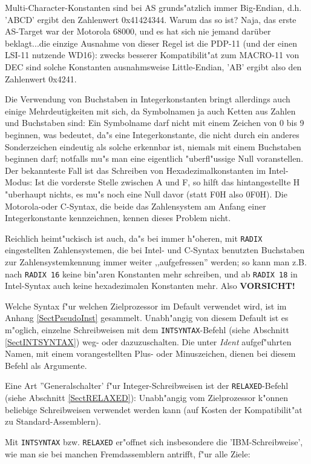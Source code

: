 \documentclass[12pt,a4paper,twoside]{report}
\newcommand{\ii}[1]{{\it #1}}
\newcommand{\tty}[1]{{\tt #1}}
\begin{document}
Multi-Character-Konstanten sind bei AS grunds"atzlich immer Big-Endian,
d.h. 'ABCD' ergibt den Zahlenwert 0x41424344.  Warum das so ist? Naja,
das erste AS-Target war der Motorola 68000, und es hat sich nie jemand
darüber beklagt...die einzige Ausnahme von
dieser Regel ist die PDP-11 (und der einen LSI-11 nutzende WD16):  zwecks
besserer Kompatibilit"at zum MACRO-11 von DEC sind solche Konstanten
ausnahmsweise Little-Endian, 'AB' ergibt also den Zahlenwert 0x4241.

Die Verwendung von Buchstaben in Integerkonstanten bringt allerdings auch
einige Mehrdeutigkeiten mit sich, da Symbolnamen ja auch Ketten aus Zahlen
und Buchstaben sind: Ein Symbolname darf nicht mit einem Zeichen von 0 bis
9 beginnen, was bedeutet, da"s eine Integerkonstante, die nicht durch ein
anderes Sonderzeichen eindeutig als solche erkennbar ist, niemals mit
einem Buchstaben beginnen darf; notfalls mu"s man eine eigentlich
"uberfl"ussige Null voranstellen.  Der bekannteste Fall ist das Schreiben
von Hexadezimalkonstanten im Intel-Modus: Ist die vorderste Stelle
zwischen A und F, so hilft das hintangestellte H "uberhaupt nichts, es
mu"s noch eine Null davor (statt F0H also 0F0H).  Die Motorola-oder
C-Syntax, die beide das Zahlensystem am Anfang einer Integerkonstante
kennzeichnen, kennen dieses Problem nicht.

Reichlich heimt"uckisch ist auch, da"s bei immer h"oheren, mit {\tt RADIX}
eingestellten Zahlensystemen, die bei Intel- und C-Syntax benutzten
Buchstaben zur Zahlensystemkennung immer weiter ,,aufgefressen'' werden; so
kann man z.B. nach {\tt RADIX 16} keine bin"aren Konstanten mehr
schreiben, und ab {\tt RADIX 18} in Intel-Syntax auch keine hexadezimalen
Konstanten mehr.  Also {\bf VORSICHT!}

Welche Syntax f"ur welchen Zielprozessor im Default verwendet wird, ist
im Anhang \ref{SectPseudoInst} gesammelt.  Unabh"angig von diesem Default
ist es m"oglich, einzelne Schreibweisen mit dem \tty{INTSYNTAX}-Befehl
(siehe Abschnitt \ref{SectINTSYNTAX}) weg- oder dazuzuschalten.  Die unter
\ii{Ident} aufgef"uhrten Namen, mit einem vorangestellten Plus- oder
Minuszeichen, dienen bei diesem Befehl als Argumente.

Eine Art ''Generalschalter' f"ur Integer-Schreibweisen ist der
\tty{RELAXED}-Befehl (siehe Abschnitt \ref{SectRELAXED}): Unabh"angig
vom Zielprozessor k"onnen beliebige Schreibweisen verwendet werden
kann (auf Kosten der Kompatibilit"at zu Standard-Assemblern).

Mit \tty{INTSYNTAX} bzw. \tty{RELAXED} er"offnet sich insbesondere die
'IBM-Schreibweise', wie man sie bei manchen Fremdassemblern antrifft,
f"ur alle Ziele:
\end{document}
